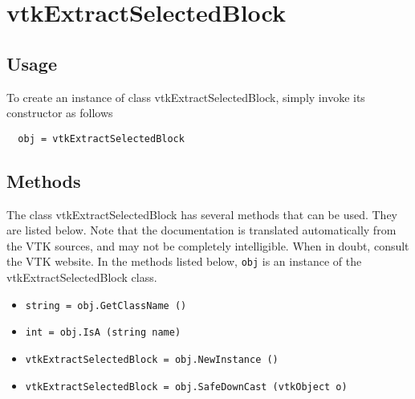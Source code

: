 \section{vtkExtractSelectedBlock}

\subsection{Usage}


To create an instance of class vtkExtractSelectedBlock, simply
invoke its constructor as follows
\begin{verbatim}
  obj = vtkExtractSelectedBlock
\end{verbatim}
\subsection{Methods}

The class vtkExtractSelectedBlock has several methods that can be used.
  They are listed below.
Note that the documentation is translated automatically from the VTK sources,
and may not be completely intelligible.  When in doubt, consult the VTK website.
In the methods listed below, \verb|obj| is an instance of the vtkExtractSelectedBlock class.
\begin{itemize}
\item  \verb|string = obj.GetClassName ()|

\item  \verb|int = obj.IsA (string name)|

\item  \verb|vtkExtractSelectedBlock = obj.NewInstance ()|

\item  \verb|vtkExtractSelectedBlock = obj.SafeDownCast (vtkObject o)|

\end{itemize}
